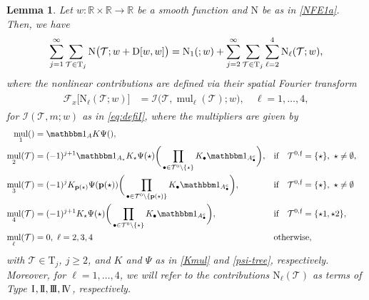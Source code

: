 \documentclass[a4paper,
11pt,  reqno]{amsart}
\makeatletter
\newcommand{\I}{\hspace{0.2mm}\textup{I}\hspace{0.2mm}}
\newcommand{\II}{\textup{I \hspace{-2.9mm} I} }
\newcommand{\III}{\textup{I \hspace{-2.9mm} I \hspace{-2.9mm} I}}
\newcommand{\IV}{\textup{I \hspace{-2.9mm} V}}
\newcommand{\5}{\textup{V}}
\newcommand{\ind}{\mathbbm 1}
\newtheorem{lemma}[theorem]{Lemma}
\theoremstyle{remark}
\newcommand{\R}{\mathbb{R}}
\newcommand{\bul}{\bullet}
\newcommand{\TT}{\mathcal{T}}
\newcommand{\Tr}{\mathrm{T}}
\newcommand{\pb}{\mathbf{p}}
\newcommand{\Ft}{{\mathcal{F}}}
\renewcommand{\l}{\ell}
\newcommand{\ff}{\mathfrak{f}}
\DeclareMathOperator{\mul}{mul}
\def\<#1>{\csname MH@symb@#1\endcsname}
\newcommand{\Ical}{\mathcal{I}}
\numberwithin{equation}{section}
\numberwithin{theorem}{section}
\newcommand{\NN}{\mathrm{N}}
\newcommand{\D}{\mathrm{D}}
\makeatother
\begin{document}
\begin{lemma}
\label{LEM:wint}
Let $w:\R \times \R\to \R$ be a smooth function and $\NN$ be as in \eqref{NFE1a}.
Then, we have
\begin{align}
\label{wint0a}
\sum_{j=1}^\infty \sum_{\TT\in \Tr_j} \NN\big(\TT; w+
\D[w, w]
\big)
=
\NN_1(\<1>;w) + \sum_{j=2}^\infty \sum_{\TT\in\Tr_j} \sum_{\ell=2}^4  \NN_\ell(\TT; w),
\end{align}
where the nonlinear contributions are defined via their spatial Fourier transform
\begin{align}
\label{wint0b}
\begin{split}
\Ft_x \big[ \NN_\ell (\TT; w) \big] & =
\Ical \big(\TT, {\mul}_\l(\TT); w \big),\quad \l=1,\dots, 4,
\end{split}
\end{align}
for $\Ical(\TT, m; w)$ as in \eqref{eq:defiI}, 
where the multipliers are given by 
\begin{align}
    \mul_1(\<1>)&= \ind_A K \Psi(\<1>),\\
    \mul_2(\TT)&=(-1)^{j+1} \ind_{A_\star} K_\star\Psi(\star) \bigg( \prod_{\bul \in \TT^0 \setminus\{\star\}}  K_\bul  \ind_{A_\bul^c} \bigg), 
    && \text{if} \quad  \TT^{0,\ff} = \{\star\}, \ \star\neq \emptyset, 
    \\
    \mul_3(\TT)&=(-1)^{j}  K_{\pb(\star)}\Psi(\pb(\star)) \bigg( \prod_{\bul \in \TT^0 \setminus\{\pb(\star)\}}  K_\bul  \ind_{A_\bul^c} \bigg),
    &&
    \text{if} \quad  \TT^{0,\ff} = \{\star\},  \ \star\neq \emptyset
    \label{wint0c}
    \\
     \mul_4(\TT)&=(-1)^{j+1}  K_\star\Psi(\star) \bigg( \prod_{\bul \in \TT^0 \setminus\{\star\}}  K_\bul  \ind_{A_\bul^c} \bigg), 
    && \text{if} \quad  \TT^{0,\ff} = \{\star1, \star2\}, 
    \\
    \mul_{\l}(\TT) & = 0, \ \l=2,3,4 && \text{otherwise}, 
\end{align}
with $\TT\in \Tr_j$,  $j \ge 2$, and $K$ and $\Psi$ as in \eqref{Kmul} and \eqref{psi-tree}, respectively.
Moreover, for $\l=1,\ldots, 4$, we will refer to the contributions $\NN_\l(\TT) $ as terms of Type $\I,\II,\III,\IV$, respectively. 



\end{lemma}
\end{document}
